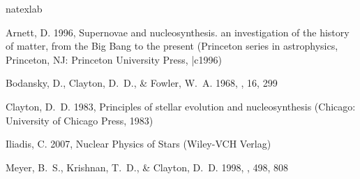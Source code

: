 \documentclass[manuscript]{aastex62}
\begin{document}
\begin{thebibliography}{5}
\expandafter\ifx\csname natexlab\endcsname\relax\def\natexlab#1{#1}\fi

{Arnett}, D. 1996, {Supernovae and nucleosynthesis. an investigation of the
  history of matter, from the Big Bang to the present} (Princeton series in
  astrophysics, Princeton, NJ: Princeton University Press, |c1996)

{Bodansky}, D., {Clayton}, D.~D., \& {Fowler}, W.~A. 1968, \apjs, 16, 299

{Clayton}, D.~D. 1983, {Principles of stellar evolution and nucleosynthesis}
  (Chicago: University of Chicago Press, 1983)

{Iliadis}, C. 2007, {Nuclear Physics of Stars} (Wiley-VCH Verlag)

{Meyer}, B.~S., {Krishnan}, T.~D., \& {Clayton}, D.~D. 1998, \apj, 498, 808

\end{thebibliography}
\end{document}
